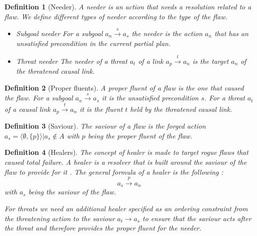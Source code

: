 \documentclass[]{article}
\newtheorem{definition}{Definition}
\begin{document}
\begin{definition}[Needer]

A needer is an action that needs a resolution related to a flaw. We
define different types of needer according to the type of the flaw.

\begin{itemize}
\item
  Subgoal needer For a subgoal \(a_n \xrightarrow{s} a_s\) the needer is
  the action \(a_n\) that has an unsatisfied precondition in the current
  partial plan.
\item
  Threat needer The needer of a threat \(a_t\) of a link
  \(a_p \xrightarrow{t} a_n\) is the target \(a_n\) of the threatened
  causal link.
\end{itemize}

\end{definition}

\begin{definition}[Proper fluents]

A proper fluent of a flaw is the one that caused the flaw. For a subgoal
\(a_n \xrightarrow{s} a_s\) it is the unsatisfied precondition \(s\).
For a threat \(a_t\) of a causal link \(a_p \xrightarrow{t} a_n\) it is
the fluent \(t\) held by the threatened causal link.

\end{definition}

\begin{definition}[Saviour]

The saviour of a flaw is the forged action
\(a_s = \langle \emptyset, \{p\} \rangle | a_s \notin A\) with \(p\)
being the proper fluent of the flaw.

\end{definition}

\begin{definition}[Healers]

The concept of healer is made to target rogue flaws that caused total
failure. A healer is a resolver that is built around the saviour of the
flaw to provide for it . The general formula of a healer is the
following : \[a_s \xrightarrow{p} a_n\] with \(a_s\) being the saviour
of the flaw.

For threats we need an additional healer specified as an ordering
constraint from the threatening action to the saviour \(a_t \to a_s\) to
ensure that the saviour acts after the threat and therefore provides the
proper fluent for the needer.

\end{definition}
\end{document}
